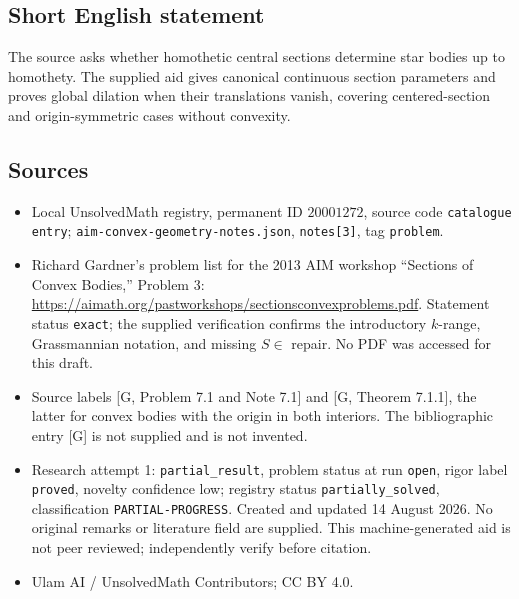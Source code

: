 \documentclass[11pt]{article}
\begin{document}
\subsection{Short English statement}
The source asks whether homothetic central sections determine star bodies up to homothety. The supplied aid gives canonical continuous section parameters and proves global dilation when their translations vanish, covering centered-section and origin-symmetric cases without convexity.
\subsection{Sources}
\begin{itemize}
\item Local UnsolvedMath registry, permanent ID \(20001272\), source code \texttt{catalogue entry}; \texttt{aim-convex-geometry-notes.json}, \texttt{notes[3]}, tag \texttt{problem}.
\item Richard Gardner's problem list for the 2013 AIM workshop ``Sections of Convex Bodies,'' Problem 3: \url{https://aimath.org/pastworkshops/sectionsconvexproblems.pdf}. Statement status \texttt{exact}; the supplied verification confirms the introductory \(k\)-range, Grassmannian notation, and missing \(S\in\) repair. No PDF was accessed for this draft.
\item Source labels [G, Problem 7.1 and Note 7.1] and [G, Theorem 7.1.1], the latter for convex bodies with the origin in both interiors. The bibliographic entry [G] is not supplied and is not invented.
\item Research attempt 1: \texttt{partial\_result}, problem status at run \texttt{open}, rigor label \texttt{proved}, novelty confidence low; registry status \texttt{partially\_solved}, classification \texttt{PARTIAL-PROGRESS}. Created and updated 14 August 2026. No original remarks or literature field are supplied. This machine-generated aid is not peer reviewed; independently verify before citation.
\item Ulam AI / UnsolvedMath Contributors; CC BY 4.0.
\end{itemize}
\end{document}
